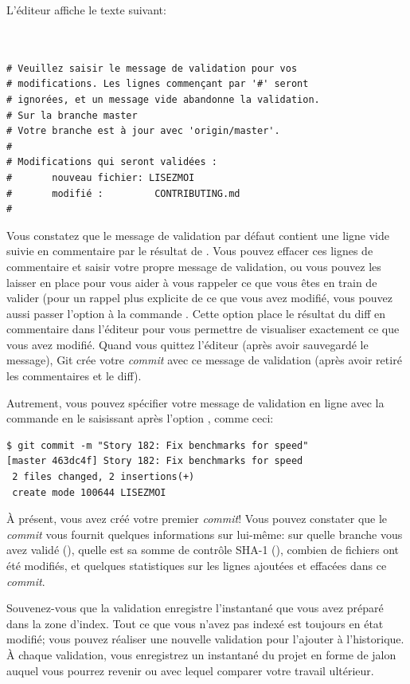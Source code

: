 L'éditeur affiche le texte suivant:
\begin{Schunk}
\begin{Verbatim}


# Veuillez saisir le message de validation pour vos
# modifications. Les lignes commençant par '#' seront
# ignorées, et un message vide abandonne la validation.
# Sur la branche master
# Votre branche est à jour avec 'origin/master'.
#
# Modifications qui seront validées :
#       nouveau fichier: LISEZMOI
#       modifié :         CONTRIBUTING.md
#
\end{Verbatim}
\end{Schunk}

Vous constatez que le message de validation par défaut contient une ligne vide suivie en commentaire par le résultat de .
Vous pouvez effacer ces lignes de commentaire et saisir votre propre message de validation, ou vous pouvez les laisser en place pour vous aider à vous rappeler ce que vous êtes en train de valider (pour un rappel plus explicite de ce que vous avez modifié, vous pouvez aussi passer l'option  à la commande .
Cette option place le résultat du diff en commentaire dans l'éditeur pour vous permettre de visualiser exactement ce que vous avez modifié.
Quand vous quittez l'éditeur (après avoir sauvegardé le message), Git crée votre \emph{commit} avec ce message de validation (après avoir retiré les commentaires et le diff).

Autrement, vous pouvez spécifier votre message de validation en ligne avec la commande  en le saisissant après l'option , comme ceci:
\begin{Schunk}
\begin{Verbatim}
$ git commit -m "Story 182: Fix benchmarks for speed"
[master 463dc4f] Story 182: Fix benchmarks for speed
 2 files changed, 2 insertions(+)
 create mode 100644 LISEZMOI
\end{Verbatim}
\end{Schunk}

À présent, vous avez créé votre premier \emph{commit}! Vous pouvez constater que le \emph{commit} vous fournit quelques informations sur lui-même: sur quelle branche vous avez validé (), quelle est sa somme de contrôle SHA-1 (), combien de fichiers ont été modifiés, et quelques statistiques sur les lignes ajoutées et effacées dans ce \emph{commit}.

Souvenez-vous que la validation enregistre l'instantané que vous avez préparé dans la zone d'index.
Tout ce que vous n'avez pas indexé est toujours en état modifié; vous pouvez réaliser une nouvelle validation pour l'ajouter à l'historique.
À chaque validation, vous enregistrez un instantané du projet en forme de jalon auquel vous pourrez revenir ou avec lequel comparer votre travail ultérieur.


